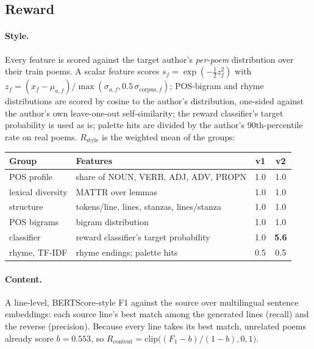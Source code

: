 \documentclass[11pt]{article}
\begin{document}
\subsection{Reward}\label{sec:reward}

\paragraph{Style.} Every feature is scored against the target author's
\emph{per-poem} distribution over their train poems. A scalar feature scores
$s_f=\exp(-\tfrac12 z_f^2)$ with
$z_f=(x_f-\mu_{a,f})/\max(\sigma_{a,f},0.5\,\sigma_{\mathrm{corpus},f})$;
POS-bigram and rhyme distributions are scored by cosine to the author's
distribution, one-sided against the author's own leave-one-out
self-similarity; the reward classifier's target probability is used as is;
palette hits are divided by the author's 90th-percentile rate on real poems.
$R_{\mathrm{style}}$ is the weighted mean of the groups:

\begin{center}\small
\begin{tabular}{llcc}
\toprule
Group & Features & v1 & v2 \\
\midrule
POS profile & share of NOUN, VERB, ADJ, ADV, PROPN & 1.0 & 1.0 \\
lexical diversity & MATTR over lemmas & 1.0 & 1.0 \\
structure & tokens/line, lines, stanzas, lines/stanza & 1.0 & 1.0 \\
POS bigrams & bigram distribution & 1.0 & 1.0 \\
classifier & reward classifier's target probability & 1.0 & \textbf{5.6} \\
rhyme, TF-IDF & rhyme endings; palette hits & 0.5 & 0.5 \\
\bottomrule
\end{tabular}
\end{center}

\paragraph{Content.} A line-level, BERTScore-style F1 against the source over
multilingual sentence embeddings: each source line's best match among the
generated lines (recall) and the reverse (precision). Because every line takes
its best match, unrelated poems already score $b=0.553$, so
$R_{\mathrm{content}}=\mathrm{clip}\big((F_1-b)/(1-b),0,1\big)$.
\end{document}
